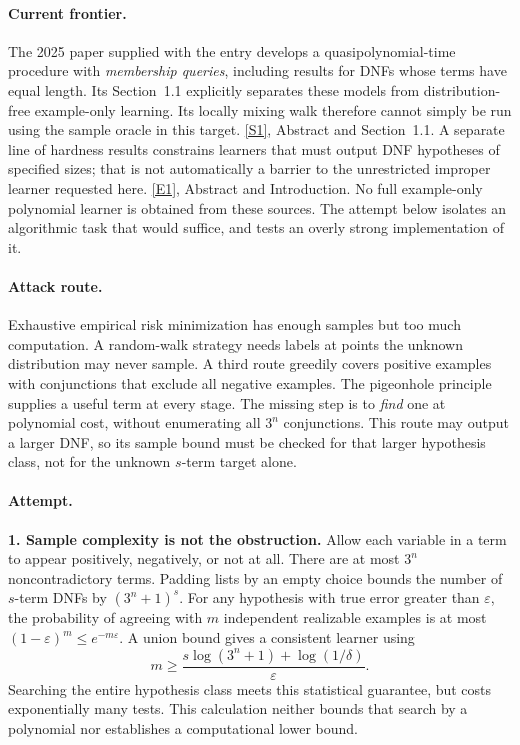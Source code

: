\documentclass[11pt,a4paper]{article}
\newcommand{\eps}{\varepsilon}
\newcommand{\sref}[2]{\hyperlink{source:#1:#2}{[S#2]}}
\newcommand{\eref}[2]{\hyperlink{extra:#1:#2}{[E#2]}}
\numberwithin{equation}{section}
\begin{document}
\paragraph{Current frontier.}
The 2025 paper supplied with the entry develops a quasipolynomial-time
procedure with \emph{membership queries}, including results for DNFs whose
terms have equal length. Its Section~1.1 explicitly separates these models
from distribution-free example-only learning. Its locally mixing walk
therefore cannot simply be run using the sample oracle in this target.
\sref{30006796}{1}, Abstract and Section~1.1.
A separate line of hardness results constrains learners that must output
DNF hypotheses of specified sizes; that is not automatically a barrier to
the unrestricted improper learner requested here. \eref{30006796}{1}, Abstract
and Introduction. No full example-only polynomial learner is obtained from
these sources. The attempt below isolates an algorithmic task that would
suffice, and tests an overly strong implementation of it.

\paragraph{Attack route.}
Exhaustive empirical risk minimization has enough samples but too much
computation. A random-walk strategy needs labels at points the unknown
distribution may never sample. A third route greedily covers positive
examples with conjunctions that exclude all negative examples. The
pigeonhole principle supplies a useful term at every stage. The missing
step is to \emph{find} one at polynomial cost, without enumerating all
$3^n$ conjunctions. This route may output a larger DNF, so its sample
bound must be checked for that larger hypothesis class, not for the
unknown $s$-term target alone.

\paragraph{Attempt.}
\textbf{1. Sample complexity is not the obstruction.}
Allow each variable in a term to appear positively, negatively, or not at
all. There are at most $3^n$ noncontradictory terms. Padding lists by an
empty choice bounds the number of $s$-term DNFs by $(3^n+1)^s$.
For any hypothesis with true error greater than $\eps$, the probability
of agreeing with $m$ independent realizable examples is at most
$(1-\eps)^m\le e^{-m\eps}$. A union bound gives a consistent learner
using
\[
 m\ge\frac{s\log(3^n+1)+\log(1/\delta)}{\eps}.
\]
Searching the entire hypothesis class meets this statistical guarantee,
but costs exponentially many tests. This calculation neither bounds that
search by a polynomial nor establishes a computational lower bound.
\end{document}
